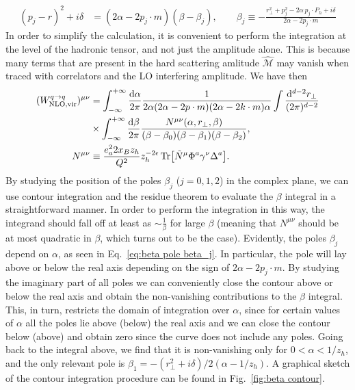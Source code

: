 \begin{equation}\label{eq:beta pole beta_j}
\begin{aligned}
        (p_j-r)^2+i\delta&=(2\alpha-2p_j \cdot m)(\beta - \beta_j),\qquad \beta_j\equiv -\frac{r_\perp^2+p_j^2-2\alpha \,p_j\cdot P_h+i\delta}{2\alpha-2p_j\cdot m}
\end{aligned}
\end{equation}
In order to simplify the calculation, it is convenient to perform the integration at the level of the hadronic tensor, and not just the amplitude alone. This is because many terms that are present in the hard scattering amlitude $\hat{\mathcal{M}}$ may vanish when traced with correlators and the LO interfering amplitude. We have then
\begin{equation}
\begin{aligned}
       (W^{q \to q}_{\text{NLO,vir}})^{\mu\nu} &=\int_{-\infty}^{+\infty}\frac{\dd \alpha}{2\pi} \frac{1}{2\alpha(2\alpha-2p \cdot m)(2\alpha-2 k \cdot m)\alpha}\int \frac{\dd^{d-2}r_\perp}{(2\pi)^{d-2}}\\
       &\times\int_{-\infty}^{+\infty}\frac{\dd \beta}{2\pi}\frac{N^{\mu\nu}(\alpha,r_\perp,\beta)}{(\beta-\beta_0)(\beta-\beta_1)(\beta-\beta_2)},\\
        N^{\mu\nu}&\equiv \frac{e_a^2 2x_B z_h }{Q^2}z_h^{-2\epsilon}\Tr[\tilde N^\mu\Phi^a\gamma^\nu \Delta^a].
\end{aligned}
\end{equation}
By studying the position of the poles $\beta_j$ ($j=0,1,2$) in the complex plane, we can use contour integration and the residue theorem to evaluate the $\beta$ integral in a straightforward manner. In order to perform the integration in this way, the integrand should fall off at least as $\sim\frac{1}{\beta}$ for large $\beta$ (meaning that $N^{\mu\nu}$ should be at most quadratic in $\beta$, which turns out to be the case). Evidently, the poles $\beta_j$ depend on $\alpha$, as seen in Eq.~\eqref{eq:beta pole beta_j}. In particular, the pole will lay above or below the real axis depending on the sign of $2\alpha-2p_j\cdot m$. By studying the imaginary part of all poles we can conveniently close the contour above or below the real axis and obtain the non-vanishing contributions to the $\beta$ integral. This, in turn, restricts the domain of integration over $\alpha$, since for certain values of $\alpha$ all the poles lie above (below) the real axis and we can close the contour below (above) and obtain zero since the curve does not include any poles. Going back to the integral above, we find that it is non-vanishing only for $0<\alpha<1/z_h$, and the only relevant pole is $\beta_1 = -(r_\perp^2+i\delta)/2(\alpha-1/z_h)$. A graphical sketch of the contour integration procedure can be found in Fig.~\ref{fig:beta contour}.
